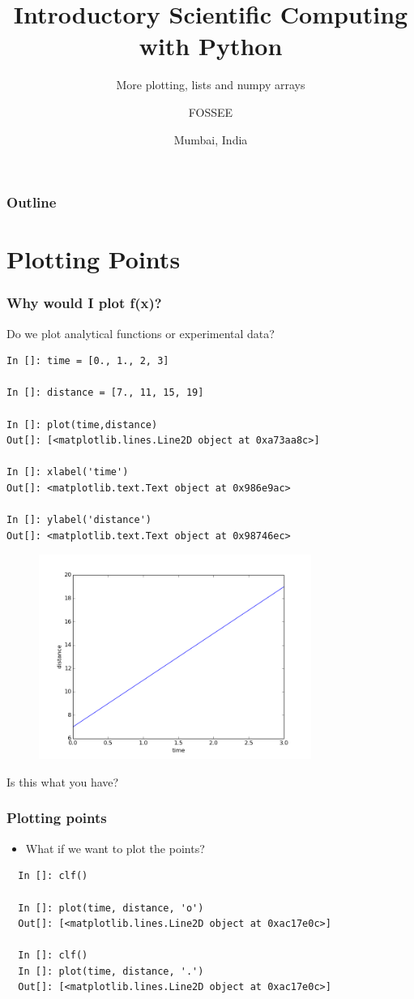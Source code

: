 \documentclass[14pt,compress]{beamer}
\title[Lists and Arrays]{Introductory Scientific Computing with
Python}
\subtitle{More plotting, lists and numpy arrays}
\author[FOSSEE] {FOSSEE}
\institute[FOSSEE -- IITB] {Department of Aerospace Engineering\\IIT Bombay}
\date[] {Mumbai, India}
\newcounter{time}
\begin{document}
\begin{frame}
  \titlepage
\end{frame}

\begin{frame}
  \frametitle{Outline}
  \tableofcontents
\end{frame}

\section{Plotting Points}
\begin{frame}[fragile]
\frametitle{Why would I plot f(x)?}
Do we plot analytical functions or experimental data?
\begin{small}
\begin{lstlisting}
In []: time = [0., 1., 2, 3]

In []: distance = [7., 11, 15, 19]

In []: plot(time,distance)
Out[]: [<matplotlib.lines.Line2D object at 0xa73aa8c>]

In []: xlabel('time')
Out[]: <matplotlib.text.Text object at 0x986e9ac>

In []: ylabel('distance')
Out[]: <matplotlib.text.Text object at 0x98746ec>
\end{lstlisting}
\end{small}
\end{frame}

\begin{frame}[fragile]
\begin{figure}
\includegraphics[width=3.5in]{data/straightline.png}
\end{figure}
\alert{Is this what you have?}
\end{frame}

\begin{frame}[fragile]
\frametitle{Plotting points}
\begin{itemize}
\item What if we want to plot the points?
\end{itemize}
\begin{lstlisting}
  In []: clf()

  In []: plot(time, distance, 'o')
  Out[]: [<matplotlib.lines.Line2D object at 0xac17e0c>]

  In []: clf()
  In []: plot(time, distance, '.')
  Out[]: [<matplotlib.lines.Line2D object at 0xac17e0c>]
\end{lstlisting}
\end{frame}
\end{document}
